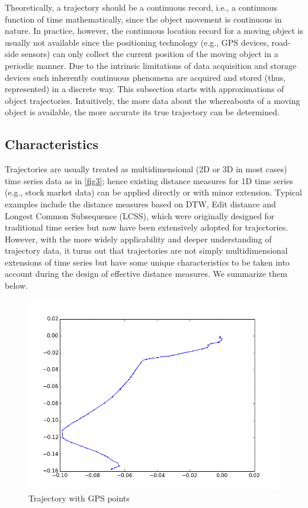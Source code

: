 \documentclass[a4paper, 12pt]{article}
\begin{document}
Theoretically, a trajectory should be a continuous record, i.e., a continuous function of time mathematically, since the object movement is continuous in nature. In practice, however, the continuous location record for a moving object is usually not available since the positioning technology (e.g., GPS devices, road-side sensors) can only collect the current position of the moving object in a periodic manner. Due to the intrinsic limitations of data acquisition and storage devices such inherently continuous phenomena are acquired and stored (thus, represented) in a discrete way. This subsection starts with approximations of object trajectories. Intuitively, the more data about the whereabouts of a moving object is available, the more accurate its true trajectory can be determined.

\subsection{Characteristics}
Trajectories are usually treated as multidimensional (2D or 3D in most cases) time series data as in \autoref{fig3}; hence existing distance measures for 1D time series (e.g., stock market data) can be applied directly or with minor extension. Typical examples include the distance measures based on DTW, Edit distance and Longest Common Subsequence (LCSS), which were originally designed for traditional time series but now have been extensively adopted for trajectories. However, with the more widely applicability and deeper understanding of trajectory data, it turns out that trajectories are not simply multidimensional extensions of time series but have some unique characteristics to be taken into account during the design of effective distance measures. We summarize them below.

\begin{figure}[ht]
    \centering
    \includegraphics[width=1\textwidth]{Trajectory.png}
    \caption{Trajectory with GPS points}
    \label{fig3}
\end{figure}
\end{document}
